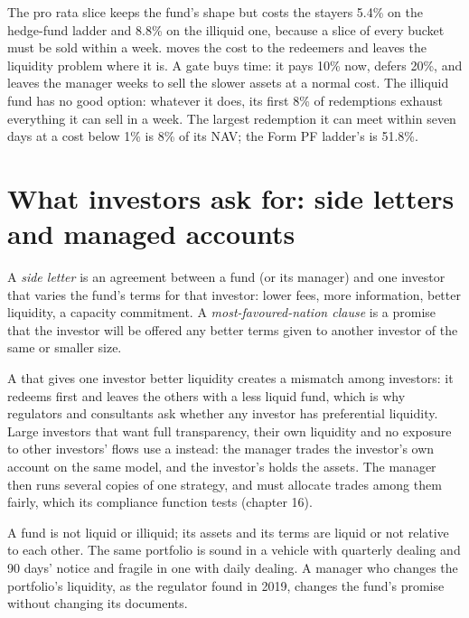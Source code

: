 The pro rata slice keeps the fund's shape but costs the stayers 5.4\% on the hedge-fund ladder and 8.8\% on the illiquid one, because a slice of
every bucket must be sold within a week.  moves the cost to the redeemers and leaves the liquidity problem where it is. A gate
buys time: it pays 10\% now, defers 20\%, and leaves the manager weeks to sell the slower assets at a normal cost. The illiquid fund has no good
option: whatever it does, its first 8\% of redemptions exhaust everything it can sell in a week. The largest redemption it can meet within seven
days at a cost below 1\% is 8\% of its NAV; the Form PF ladder's is 51.8\%.

\section{What investors ask for: side letters and managed accounts}

\begin{definition}\label{def:fm:the-asset-manager-and-the-fund:side}
A \emph{side letter} is an agreement between a fund (or its manager) and one investor that varies the fund's terms for that
investor: lower fees, more information, better liquidity, a capacity commitment. A \emph{most-favoured-nation clause} is a promise that the investor will be offered any better terms given to another investor of the same or smaller size.
\end{definition}

A  that gives one investor better liquidity creates a mismatch among investors: it redeems first and leaves the others with a less
liquid fund, which is why regulators and consultants ask whether any investor has preferential liquidity. Large investors that want full
transparency, their own liquidity and no exposure to other investors' flows use a  instead: the manager trades the
investor's own account on the same model, and the investor's  holds the assets. The manager then runs several copies of one strategy, and
must allocate trades among them fairly, which its compliance function tests (chapter 16).

\begin{remark}\label{rem:fm:the-asset-manager-and-the-fund:pair}
A fund is not liquid or illiquid; its assets and its terms are liquid or not relative to each other. The same portfolio is sound in a vehicle with
quarterly dealing and 90 days' notice and fragile in one with daily dealing. A manager who changes the portfolio's liquidity, as the regulator
found in 2019, changes the fund's promise without changing its documents.
\end{remark}

